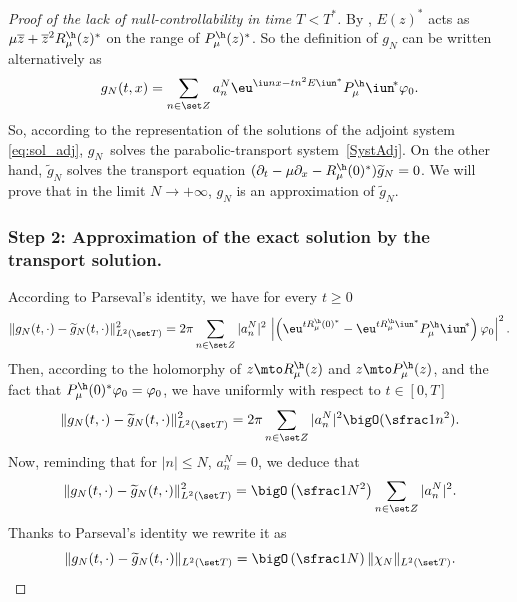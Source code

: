 \begin{proof}[Proof of the lack of null-controllability in time $T<T^*$]
By , $E(z)^*$ acts as $\mu\overline z + \overline z^2 R_\mu^\h(z)^*$ on the range of $P_\mu^\h(z)^*$. So the definition of $g_N$ can be written alternatively as
\[
g_N(t,x) = \sum_{n\in\set Z} a_n^N
\eu^{\iu nx-tn^2 E\iun^*}P_\mu^\h\iun^{\!*}\varphi_0.
\]
So, according to the representation of the solutions of the adjoint system \eqref{eq:sol_adj}, $g_N$~solves the parabolic-transport system~\eqref{SystAdj}. On the other hand, $\widetilde g_N$ solves the transport equation $(\partial_t-\mu\partial_x -R_\mu^\h(0)^*)\widetilde g_N = 0$. We will prove that in the limit $N\to +\infty$, $g_N$ is an approximation of $\widetilde g_N$.

\subsubsection*{Step 2: Approximation of the exact solution by the transport solution.}
According to Parseval's identity, we have for every $t\geq 0$
\[
\lVert g_N(t,\cdot)-\widetilde g_N(t,\cdot)\rVert^2_{L^2(\set T)}
= 2\pi\sum_{n\in\set Z} |a_n^N|^2\,\left| \left(
\eu^{tR_\mu^\h(0)^*} - \eu^{tR_\mu^\h\iun^*}P_\mu^\h\iun^{\!*}
\right)\varphi_0\right|^2.
\]
Then, according to the holomorphy of $z\mto R_\mu^\h(z)$ and $z\mto P_\mu^\h(z)$, and the fact that $P_\mu^\h(0)^*\varphi_0 = \varphi_0$, we have uniformly with respect to $t\in [0,T]$
\[
\lVert g_N(t,\cdot)-\widetilde g_N(t,\cdot)\rVert^2_{L^2(\set T)}
= 2\pi\sum_{n\in\set Z} |a_n^N|^2\bigO(\sfrac1{n^2}).
\]
Now, reminding that for $|n|\leq N$, $a_n^N = 0$, we deduce that
\[
\lVert g_N(t,\cdot)-\widetilde g_N(t,\cdot)\rVert^2_{L^2(\set T)}
= \bigO\left(\sfrac1{N^2}\right)\sum_{n\in\set Z} |a_n^N|^2.
\]
Thanks to Parseval's identity we rewrite it as
\begin{equation}
\label{eq:approx_gN}
\lVert g_N(t,\cdot)-\widetilde g_N(t,\cdot)\rVert_{L^2(\set T)} =
\bigO\left(\sfrac 1N\right)\lVert\chi_N\rVert_{L^2(\set T)}.
\end{equation}


\end{proof}
